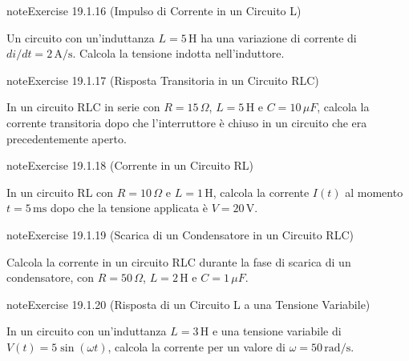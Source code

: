 \documentclass[letterpaper,10pt,italian]{jupyterBook}
\begin{document}
\begin{sphinxadmonition}{note}{Exercise 19.1.16 (Impulso di Corrente in un Circuito L)}



\sphinxAtStartPar
Un circuito con un’induttanza \(L = 5 \, \text{H}\) ha una variazione di corrente di \(di/dt = 2 \, \text{A/s}\). Calcola la tensione indotta nell’induttore.
\end{sphinxadmonition}
 \label{exercise:ch/electromagnetism/circuits-electric-problems-exercise-16}

\begin{sphinxadmonition}{note}{Exercise 19.1.17 (Risposta Transitoria in un Circuito RLC)}



\sphinxAtStartPar
In un circuito RLC in serie con \(R = 15 \, \Omega\), \(L = 5 \, \text{H}\) e \(C = 10 \, \mu F\), calcola la corrente transitoria dopo che l’interruttore è chiuso in un circuito che era precedentemente aperto.
\end{sphinxadmonition}
 \label{exercise:ch/electromagnetism/circuits-electric-problems-exercise-17}

\begin{sphinxadmonition}{note}{Exercise 19.1.18 (Corrente in un Circuito RL)}



\sphinxAtStartPar
In un circuito RL con \(R = 10 \, \Omega\) e \(L = 1 \, \text{H}\), calcola la corrente \(I(t)\) al momento \(t = 5 \, \text{ms}\) dopo che la tensione applicata è \(V = 20 \, \text{V}\).
\end{sphinxadmonition}
 \label{exercise:ch/electromagnetism/circuits-electric-problems-exercise-18}

\begin{sphinxadmonition}{note}{Exercise 19.1.19 (Scarica di un Condensatore in un Circuito RLC)}



\sphinxAtStartPar
Calcola la corrente in un circuito RLC durante la fase di scarica di un condensatore, con \(R = 50 \, \Omega\), \(L = 2 \, \text{H}\) e \(C = 1 \, \mu F\).
\end{sphinxadmonition}
 \label{exercise:ch/electromagnetism/circuits-electric-problems-exercise-19}

\begin{sphinxadmonition}{note}{Exercise 19.1.20 (Risposta di un Circuito L a una Tensione Variabile)}



\sphinxAtStartPar
In un circuito con un’induttanza \(L = 3 \, \text{H}\) e una tensione variabile di \(V(t) = 5 \sin(\omega t)\), calcola la corrente per un valore di \(\omega = 50 \, \text{rad/s}\).
\end{sphinxadmonition}
\end{document}
